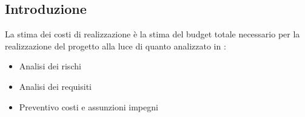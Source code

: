 \subsection{Introduzione}
La stima dei costi di realizzazione è la stima del budget totale necessario per la realizzazione del progetto alla luce di quanto analizzato in :
\begin{itemize}
    \item Analisi dei rischi
    \item Analisi dei requisiti
    \item Preventivo costi e assunzioni impegni
\end{itemize}

